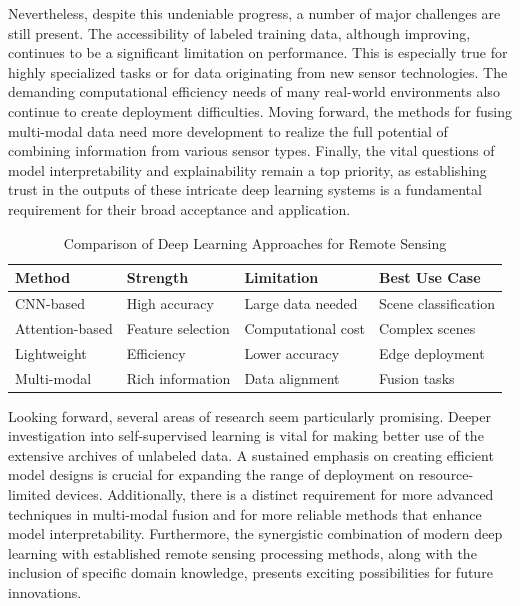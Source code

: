\documentclass[12pt,a4paper]{article}
\begin{document}
Nevertheless, despite this undeniable progress, a number of major challenges are still present. The accessibility of labeled training data, although improving, continues to be a significant limitation on performance. This is especially true for highly specialized tasks or for data originating from new sensor technologies. The demanding computational efficiency needs of many real-world environments also continue to create deployment difficulties. Moving forward, the methods for fusing multi-modal data need more development to realize the full potential of combining information from various sensor types. Finally, the vital questions of model interpretability and explainability remain a top priority, as establishing trust in the outputs of these intricate deep learning systems is a fundamental requirement for their broad acceptance and application.

\begin{table}[htbp]
\centering
\caption{Comparison of Deep Learning Approaches for Remote Sensing}
\label{tab:comparison}
\begin{tabular}{@{}llll@{}}
\toprule
\textbf{Method} & \textbf{Strength} & \textbf{Limitation} & \textbf{Best Use Case} \\ 
\midrule
CNN-based & High accuracy & Large data needed & Scene classification \\
Attention-based & Feature selection & Computational cost & Complex scenes \\
Lightweight & Efficiency & Lower accuracy & Edge deployment \\
Multi-modal & Rich information & Data alignment & Fusion tasks \\
\bottomrule
\end{tabular}
\end{table}

Looking forward, several areas of research seem particularly promising. Deeper investigation into self-supervised learning is vital for making better use of the extensive archives of unlabeled data. A sustained emphasis on creating efficient model designs is crucial for expanding the range of deployment on resource-limited devices. Additionally, there is a distinct requirement for more advanced techniques in multi-modal fusion and for more reliable methods that enhance model interpretability. Furthermore, the synergistic combination of modern deep learning with established remote sensing processing methods, along with the inclusion of specific domain knowledge, presents exciting possibilities for future innovations.
\end{document}
